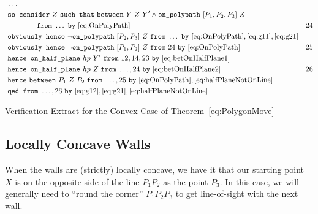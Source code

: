 \begin{boxedfigure}
\small
\begin{align*}
&\ldots\\
&\code{so consider}\ Z\ \code{such that}\ \between{Y}{Z}{Y'} \wedge \code{on\_polypath}\ [P_1,P_2,P_3]\ Z\\\
&\qquad\qquad\code{from}\ \ldots\ \code{by}\ \eqref{eq:OnPolyPath} & 24\\
&\code{obviously hence}\ \neg\code{on\_polypath}\ [P_2,P_3]\ Z\ \code{from}\ \ldots\ \code{by}\ \eqref{eq:OnPolyPath},\eqref{eq:g11},\eqref{eq:g21}\\
&\code{obviously hence}\ \neg\code{on\_polypath}\ [P_1,P_2]\ Z\ \code{from}\ 24\ \code{by}\ \eqref{eq:OnPolyPath}&25\\
&\code{hence on\_half\_plane}\ hp\ Y'\ \code{from}\ 12,14,23\ \code{by}\ \eqref{eq:betOnHalfPlane1}\\
&\code{hence on\_half\_plane}\ hp\ Z\ \code{from}\ \ldots,24\ \code{by}\ \eqref{eq:betOnHalfPlane2} & 26\\
&\code{hence}\ \between{P_1}{Z}{P_2}\ \code{from}\ \ldots,25\ \code{by}\ \eqref{eq:OnPolyPath},\eqref{eq:halfPlaneNotOnLine}\\
&\code{qed from}\ \ldots,26\ \code{by}\ \eqref{eq:g12},\eqref{eq:g21},\eqref{eq:halfPlaneNotOnLine}
\end{align*}
\caption{Verification Extract for the Convex Case of Theorem~\ref{eq:PolygonMove}}
\label{fig:ConvexVerification}
\end{boxedfigure}

\subsection{Locally Concave Walls}
When the walls are (strictly) locally concave, we have it that our starting point $X$ is on the opposite side of the line $P_1P_2$ as the point $P_3$. In this case, we will generally need to ``round the corner'' $P_1P_2P_3$ to get line-of-sight with the next wall. 

